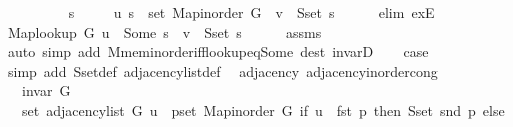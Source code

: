 \begin{isabellebody}
\isamarkupfalse%
\isanewline
\ \ \isamarkupfalse%
\ {}\isanewline
\ \ \isamarkupfalse%
\ \isamarkupfalse%
\ s\ \isanewline
\ \ \ \ {\isachardoublequoteopen}{\isacharparenleft}{\kern0pt}u{\isacharcomma}{\kern0pt}\ s{\isacharparenright}{\kern0pt}\ {\isasymin}\ set\ {\isacharparenleft}{\kern0pt}Map{\isacharunderscore}{\kern0pt}inorder\ G{\isacharparenright}{\kern0pt}\ {\isasymand}\ v\ {\isasymin}\ S{\isachardot}{\kern0pt}set\ s{\isachardoublequoteclose}\isanewline
\ \ \ \ \isamarkupfalse%
\ {\isacharparenleft}{\kern0pt}elim\ exE{\isacharparenright}{\kern0pt}\isanewline
\ \ \isamarkupfalse%
\ {\isachardoublequoteopen}Map{\isacharunderscore}{\kern0pt}lookup\ G\ u\ {\isacharequal}{\kern0pt}\ Some\ s\ {\isasymand}\ v\ {\isasymin}\ S{\isachardot}{\kern0pt}set\ s{\isachardoublequoteclose}\isanewline
\ \ \ \ \isamarkupfalse%
\ assms\isanewline
\ \ \ \ \isamarkupfalse%
\ {\isacharparenleft}{\kern0pt}auto\ simp\ add{\isacharcolon}{\kern0pt}\ M{\isachardot}{\kern0pt}mem{\isacharunderscore}{\kern0pt}inorder{\isacharunderscore}{\kern0pt}iff{\isacharunderscore}{\kern0pt}lookup{\isacharunderscore}{\kern0pt}eq{\isacharunderscore}{\kern0pt}Some\ dest{\isacharcolon}{\kern0pt}\ invarD{\isacharparenleft}{\kern0pt}{}{\isacharparenright}{\kern0pt}{\isacharparenright}{\kern0pt}\isanewline
\ \ \isamarkupfalse%
\ {\isacharquery}{\kern0pt}case\isanewline
\ \ \ \ \isamarkupfalse%
\ {\isacharparenleft}{\kern0pt}simp\ add{\isacharcolon}{\kern0pt}\ S{\isachardot}{\kern0pt}set{\isacharunderscore}{\kern0pt}def\ adjacency{\isacharunderscore}{\kern0pt}list{\isacharunderscore}{\kern0pt}def{\isacharparenright}{\kern0pt}\isanewline
{}\isamarkupfalse%
%
\endisatagproof
{\isafoldproof}%
%
\isadelimproof
\isanewline
%
\endisadelimproof
%
\isadeliminvisible
\isanewline
%
\endisadeliminvisible
%
\isataginvisible
{}\isamarkupfalse%
\ {\isacharparenleft}{\kern0pt}\ adjacency{\isacharparenright}{\kern0pt}\ adjacency{\isacharunderscore}{\kern0pt}inorder{\isacharunderscore}{\kern0pt}cong{\isacharcolon}{\kern0pt}\isanewline
\ \ \ {\isachardoublequoteopen}invar\ G{\isachardoublequoteclose}\isanewline
\ \ \ {\isachardoublequoteopen}set\ {\isacharparenleft}{\kern0pt}adjacency{\isacharunderscore}{\kern0pt}list\ G\ u{\isacharparenright}{\kern0pt}\ {\isacharequal}{\kern0pt}\ {\isacharparenleft}{\kern0pt}{\isasymUnion}p{\isasymin}set\ {\isacharparenleft}{\kern0pt}Map{\isacharunderscore}{\kern0pt}inorder\ G{\isacharparenright}{\kern0pt}{\isachardot}{\kern0pt}\ if\ u\ {\isacharequal}{\kern0pt}\ fst\ p\ then\ S{\isachardot}{\kern0pt}set\ {\isacharparenleft}{\kern0pt}snd\ p{\isacharparenright}{\kern0pt}\ else\ {\isacharbraceleft}{\kern0pt}{\isacharbraceright}{\kern0pt}{\isacharparenright}{\kern0pt}{\isachardoublequoteclose}%

\end{isabellebody}
